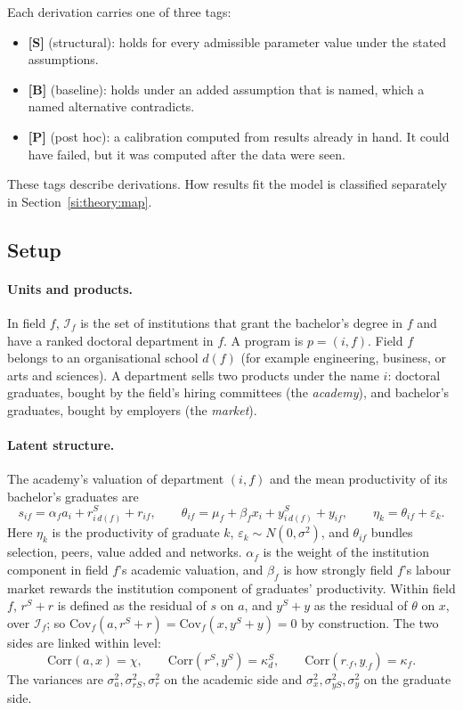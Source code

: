 \documentclass[11pt]{article}
\begin{document}
Each derivation carries one of three tags:
\begin{itemize}
\item \textbf{[S]} (structural): holds for every admissible parameter value under the stated assumptions.
\item \textbf{[B]} (baseline): holds under an added assumption that is named, which a named alternative contradicts.
\item \textbf{[P]} (post hoc): a calibration computed from results already in hand. It could have failed, but it
was computed after the data were seen.
\end{itemize}
These tags describe derivations. How results fit the model is classified separately in
Section~\ref{si:theory:map}.

\subsection{Setup}\label{si:theory:setup}

\paragraph{Units and products.} In field $f$, $\mathcal I_f$ is the set of institutions that grant the
bachelor's degree in $f$ and have a ranked doctoral department in $f$. A program is $p=(i,f)$. Field $f$ belongs
to an organisational school $d(f)$ (for example engineering, business, or arts and sciences). A department sells
two products under the name $i$: doctoral graduates, bought by the field's hiring committees (the
\emph{academy}), and bachelor's graduates, bought by employers (the \emph{market}).

\paragraph{Latent structure.} The academy's valuation of department $(i,f)$ and the mean productivity of its
bachelor's graduates are
\begin{equation}\label{eq:T-latent}
s_{if}=\alpha_fa_i+r^S_{i\,d(f)}+r_{if},\qquad
\theta_{if}=\mu_f+\beta_fx_i+y^S_{i\,d(f)}+y_{if},\qquad \eta_k=\theta_{if}+\varepsilon_k .
\end{equation}
Here $\eta_k$ is the productivity of graduate $k$, $\varepsilon_k\sim N(0,\sigma^2)$, and $\theta_{if}$ bundles
selection, peers, value added and networks. $\alpha_f$ is the weight of the institution component in field $f$'s
academic valuation, and $\beta_f$ is how strongly field $f$'s labour market rewards the institution component of
graduates' productivity. Within field $f$, $r^S+r$ is defined as the residual of $s$ on $a$, and $y^S+y$ as the
residual of $\theta$ on $x$, over $\mathcal I_f$; so $\mathrm{Cov}_f(a,r^S+r)=\mathrm{Cov}_f(x,y^S+y)=0$ by
construction. The two sides are linked within level:
\[
\mathrm{Corr}(a,x)=\chi,\qquad \mathrm{Corr}(r^S,y^S)=\kappa^S_d,\qquad \mathrm{Corr}(r_{\cdot f},y_{\cdot f})=\kappa_f .
\]
The variances are $\sigma_a^2,\sigma_{rS}^2,\sigma_r^2$ on the academic side and $\sigma_x^2,\sigma_{yS}^2,\sigma_y^2$
on the graduate side.
\end{document}
